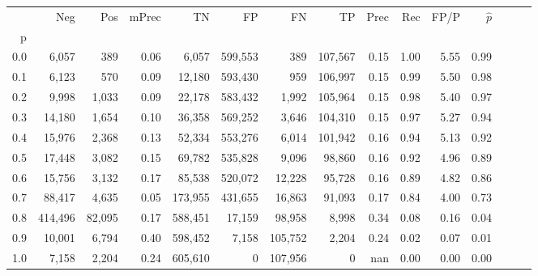 \begin{tabular}{rrrrrrrrrrrrrrr}
\toprule
{} &      Neg &     Pos & mPrec &       TN &       FP &       FN &       TP &  Prec &   Rec &  FP/P & $\hat{p}$ \\
p   &          &         &       &          &          &          &          &       &       &       &           \\
\midrule
0.0 &    6,057 &     389 &  0.06 &    6,057 &  599,553 &      389 &  107,567 &  0.15 &  1.00 &  5.55 &      0.99 \\
0.1 &    6,123 &     570 &  0.09 &   12,180 &  593,430 &      959 &  106,997 &  0.15 &  0.99 &  5.50 &      0.98 \\
0.2 &    9,998 &   1,033 &  0.09 &   22,178 &  583,432 &    1,992 &  105,964 &  0.15 &  0.98 &  5.40 &      0.97 \\
0.3 &   14,180 &   1,654 &  0.10 &   36,358 &  569,252 &    3,646 &  104,310 &  0.15 &  0.97 &  5.27 &      0.94 \\
0.4 &   15,976 &   2,368 &  0.13 &   52,334 &  553,276 &    6,014 &  101,942 &  0.16 &  0.94 &  5.13 &      0.92 \\
0.5 &   17,448 &   3,082 &  0.15 &   69,782 &  535,828 &    9,096 &   98,860 &  0.16 &  0.92 &  4.96 &      0.89 \\
0.6 &   15,756 &   3,132 &  0.17 &   85,538 &  520,072 &   12,228 &   95,728 &  0.16 &  0.89 &  4.82 &      0.86 \\
0.7 &   88,417 &   4,635 &  0.05 &  173,955 &  431,655 &   16,863 &   91,093 &  0.17 &  0.84 &  4.00 &      0.73 \\
0.8 &  414,496 &  82,095 &  0.17 &  588,451 &   17,159 &   98,958 &    8,998 &  0.34 &  0.08 &  0.16 &      0.04 \\
0.9 &   10,001 &   6,794 &  0.40 &  598,452 &    7,158 &  105,752 &    2,204 &  0.24 &  0.02 &  0.07 &      0.01 \\
1.0 &    7,158 &   2,204 &  0.24 &  605,610 &        0 &  107,956 &        0 &   nan &  0.00 &  0.00 &      0.00 \\
\bottomrule
\end{tabular}
